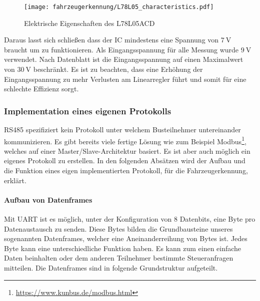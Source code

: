 \begin{figure}[H]
    \centering
    \texttt{[image: fahrzeugerkennung/L78L05\_characteristics.pdf]}
    \caption{Elektrische Eigenschaften des L78L05ACD}
\end{figure}

Daraus lasst sich schließen dass der IC mindestens eine Spannung von $\SI{7}{\volt}$ braucht um zu funktionieren. Als Eingangsspannung für alle Messung wurde $\SI{9}{\volt}$ verwendet. Nach Datenblatt ist die Eingangsspannung auf 
einen Maximalwert von $\SI{30}{\volt}$ beschränkt. Es ist zu beachten, dass eine Erhöhung der Eingangsspannung zu mehr Verlusten am Linearregler führt und somit für eine schlechte Effizienz sorgt.

\subsubsection{Implementation eines eigenen Protokolls}

RS485 spezifiziert kein Protokoll unter welchem Busteilnehmer untereinander kommunizieren. Es gibt bereits viele fertige Lösung wie zum Beispiel Modbus\footnote{\url{https://www.kunbus.de/modbus.html}}, 
welches auf einer Master/Slave-Architektur basiert. Es ist aber auch möglich ein eigenes Protokoll zu erstellen.
In den folgenden Absätzen wird der Aufbau und die Funktion eines eigen implementierten Protokoll, für die Fahrzeugerkennung, erklärt.
\pagebreak
\paragraph{Aufbau von Datenframes}\mbox{}

Mit UART ist es möglich, unter der Konfiguration von 8 Datenbits, eine Byte pro Datenaustausch zu senden. Diese Bytes bilden die Grundbausteine unseres sogenannten Datenframes, welcher eine Aneinanderreihung von Bytes ist. Jedes Byte
kann eine unterschiedliche Funktion haben. Es kann zum einen einfache Daten beinhalten oder dem anderen Teilnehmer bestimmte Steueranfragen mitteilen. Die Datenframes sind in folgende Grundstruktur aufgeteilt.

